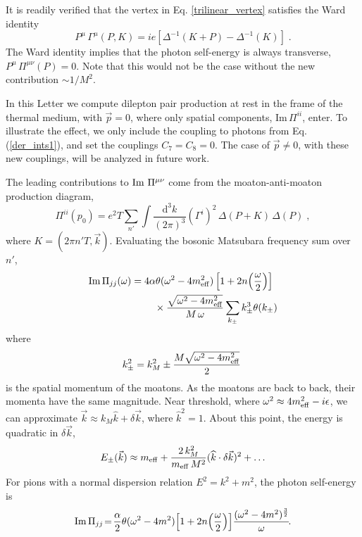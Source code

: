 \documentclass[twocolumn,prd,superscriptaddress, colorlinks, linkcolor=refcol, citecolor=refcol, urlcolor=refcol]{revtex4-2}
\newcommand{\dr}{\ensuremath{\mathrm{d}}}
\newcommand{\photonSelfE}{\ensuremath{\Pi}}
\begin{document}
It is readily verified
that the vertex in
Eq. \eqref{trilinear_vertex} satisfies the Ward identity
%
\begin{equation}
  P^\mu \, \Gamma^\mu(P,K) = i e \left[ \Delta^{-1}(K+P) - \Delta^{-1}(K) \right] \; .
  \label{ward_identity}
\end{equation}
%
The Ward identity 
implies that the photon self-energy is always transverse,
$P^\mu\,  \photonSelfE^{\mu \nu}(P) = 0$.
Note that this would not be the case without the new contribution $\sim 1/M^2$. 

In this Letter we compute   
dilepton pair production at rest in the frame
of the thermal medium, with $\vec{p} = 0$,
where only spatial components, $\mathrm{Im}\, \photonSelfE^{ii}$, enter.  
To illustrate the effect, we only include the coupling
to photons from Eq. (\ref{der_ints1}), and set the couplings
$C_7 = C_8 = 0$.  The case of
$\vec{p} \neq 0$, with these new couplings,
will be analyzed in future work.

The leading 
contributions to ${\rm Im}\,\, \Pi^{\mu\nu}$ come from 
the moaton-anti-moaton production diagram,
%
\begin{equation}
    \Pi^{i i}(p_0) = e^2 T \sum_{n'} \int \frac{\dr^3 k}{(2\pi)^3} \left(\Gamma^i\right)^2 \, \Delta(P+K) \, \Delta(P) \; ,
    \label{eq:loop}
\end{equation}
%
where $K=(2 \pi n' T ,\vec k)$.
Evaluating the bosonic Matsubara frequency sum over $n'$,
%
\begin{align}
    {\rm Im}\,\Pi_{jj}(\omega) ={}& 4\alpha \theta(\omega^2- 4 m_{\rm eff}^2) \left[1+2 n\!\left(\frac{\omega}{2}\right)\right]
    \nonumber \\
    &\quad \times \frac{  \sqrt{\omega^2 - 4 m_{\rm eff}^2}}{ M \, \omega } \sum_{k_\pm}  k_\pm^3 \theta(k_\pm)
\label{eq:photonselfenergy_moat}
\end{align}
%
where
%
\begin{equation}
    k_\pm^2 = k_M^2 \pm 
    \frac{M \sqrt{\omega^2 - 4 m_{\rm eff}^2}  }{2}  \;
\end{equation}
is the spatial momentum of the moatons.  As the moatons
are back to back, their momenta have the same magnitude.
Near threshold, where
$\omega^2 \approx 4 m_{\rm eff}^2- i\epsilon$, we can approximate  
$\vec{k} \approx k_M \widehat{k} + \delta \vec{k}$,
where $\widehat{k}^2 = 1$.
About this point, the energy is quadratic in 
$\delta \vec{k}$,
%
\begin{equation}
    E_\pm(\vec{k}) \approx m_{\rm eff} +
    \frac{2 \, k_M^2}{m_{\rm eff}\, M^2} (\widehat{k} \cdot \delta \vec{k})^2 
    + \ldots 
    \end{equation}
%
For pions with a normal dispersion relation
$E^2 = k^2 + m^2$, the photon self-energy is
\begin{align}
    {\rm Im}\,\Pi_{jj}\!=\! \frac{\alpha}{2}  \theta(\omega^2 - 4m^2) \!\left[1+2n\!\left(\frac{\omega}{2}\right)\right]\! %
    \frac{(\omega^2 - 4m^2)^{\frac{3}{2}}} {\omega}\!.
    \label{eq:normal}
\end{align}
% 
\end{document}
